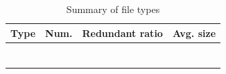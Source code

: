 \begin{table} 
	\centering 
	\scriptsize  
	\caption{Summary of file types} \label{tbl:redundant_ratio} 
	\begin{tabular}{|l|l|l|l|}%
		\hline 
		Type & Num. & Redundant ratio & Avg. size  \\
		\hline
		  &   &   &     \\
		\hline
		  &   &   &      \\
		\hline
		  &   &   &      \\
		\hline
		 &  &  &  \\
		\hline
		  & &  &   \\
		\hline
		  & &  &   \\
		\hline
		   &  &  & \\
		\hline
	\end{tabular} 
\end{table} 





